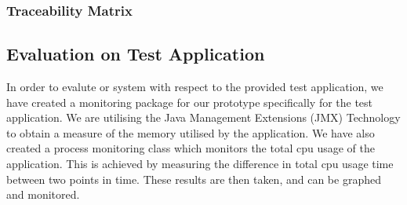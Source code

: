 \documentclass[10pt,a4paper]{article}
\begin{document}
 \subsubsection{Traceability Matrix}

\subsection{Evaluation on Test Application}
\label{sec:prototype-evaluation}
In order to evalute or system with respect to the provided test application, 
we have created a monitoring package for our prototype specifically for the 
test application. We are utilising the Java Management Extensions (JMX) 
Technology to obtain a measure of the memory utilised by the application. 
We have also created a process monitoring class which monitors the total
 cpu usage of the application. This is achieved by 
 measuring the difference in total cpu usage time between two points in 
 time. These results are then taken, and can be graphed and monitored.







\vfill


\end{document}
